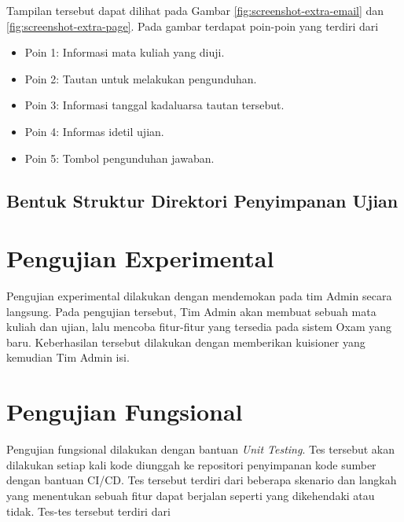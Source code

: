     Tampilan tersebut dapat dilihat pada Gambar \ref{fig:screenshot-extra-email} dan 
    \ref{fig:screenshot-extra-page}. Pada gambar terdapat poin-poin yang terdiri dari
    \begin{itemize}
        \item Poin 1: Informasi mata kuliah yang diuji.
        \item Poin 2: Tautan untuk melakukan pengunduhan.
        \item Poin 3: Informasi tanggal kadaluarsa tautan tersebut.
        \item Poin 4: Informas idetil ujian.
        \item Poin 5: Tombol pengunduhan jawaban.
    \end{itemize}

    \subsection{Bentuk Struktur Direktori Penyimpanan Ujian}
    


\section{Pengujian Experimental}
Pengujian experimental dilakukan dengan mendemokan pada tim Admin secara langsung. Pada pengujian
tersebut, Tim Admin akan membuat sebuah mata kuliah dan ujian, lalu mencoba fitur-fitur yang tersedia
pada sistem Oxam yang baru. Keberhasilan tersebut dilakukan dengan memberikan kuisioner yang kemudian
Tim Admin isi.


\section{Pengujian Fungsional}
Pengujian fungsional dilakukan dengan bantuan \textit{Unit Testing}. Tes tersebut akan dilakukan
setiap kali kode diunggah ke repositori penyimpanan kode sumber dengan bantuan CI/CD. Tes tersebut
terdiri dari beberapa skenario dan langkah yang menentukan sebuah fitur dapat berjalan seperti
yang dikehendaki atau tidak. Tes-tes tersebut terdiri dari
